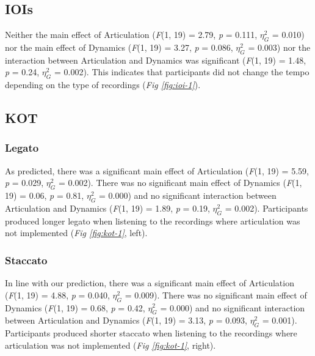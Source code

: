 \documentclass[
  man,floatsintext]{apa6}
\begin{document}
\hypertarget{iois}{%
\subsection{IOIs}\label{iois}}

Neither the main effect of Articulation (\emph{F}(1, 19) = 2.79, \emph{p} = 0.111, \(\eta_G^2\) = 0.010) nor the main effect of Dynamics (\emph{F}(1, 19) = 3.27, \emph{p} = 0.086, \(\eta_G^2\) = 0.003) nor the interaction between Articulation and Dynamics was significant (\emph{F}(1, 19) = 1.48, \emph{p} = 0.24, \(\eta_G^2\) = 0.002). This indicates that participants did not change the tempo depending on the type of recordings (\emph{Fig \ref{fig:ioi-1}}).

\hypertarget{kot}{%
\subsection{KOT}\label{kot}}

\hypertarget{legato}{%
\subsubsection{Legato}\label{legato}}

As predicted, there was a significant main effect of Articulation (\emph{F}(1, 19) = 5.59, \emph{p} = 0.029, \(\eta_G^2\) = 0.002). There was no significant main effect of Dynamics (\emph{F}(1, 19) = 0.06, \emph{p} = 0.81, \(\eta_G^2\) = 0.000) and no significant interaction between Articulation and Dynamics (\emph{F}(1, 19) = 1.89, \emph{p} = 0.19, \(\eta_G^2\) = 0.002). Participants produced longer legato when listening to the recordings where articulation was not implemented (\emph{Fig \ref{fig:kot-1}}, left).

\hypertarget{staccato}{%
\subsubsection{Staccato}\label{staccato}}

In line with our prediction, there was a significant main effect of Articulation (\emph{F}(1, 19) = 4.88, \emph{p} = 0.040, \(\eta_G^2\) = 0.009). There was no significant main effect of Dynamics (\emph{F}(1, 19) = 0.68, \emph{p} = 0.42, \(\eta_G^2\) = 0.000) and no significant interaction between Articulation and Dynamics (\emph{F}(1, 19) = 3.13, \emph{p} = 0.093, \(\eta_G^2\) = 0.001). Participants produced shorter staccato when listening to the recordings where articulation was not implemented (\emph{Fig \ref{fig:kot-1}}, right).
\end{document}
